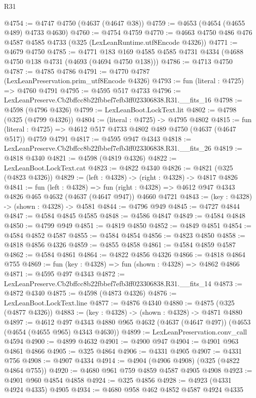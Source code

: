 \begin{lexlean}{R31}
\begin{coremodule}
@4754 := @4747 @4750 (@4637 (@4647 @38))
@4759 := @4653 (@4654 (@4655 @489) @4733 @4630)
@4760 := @4754 @4759
@4770 := @4663 @4750 @486 @476 @4587 @4585 @4733 (@325 (LexLeanRuntime.utf8Encode @4326))
@4771 := @4679 @4750
@4785 := @4771 @183 @169 @4585 @4585 @4731 @4334 (@4688 @4750 @138 @4731 (@4693 (@4694 @4750 @138)))
@4786 := @4713 @4750
@4787 := @4785 @4786
@4791 := @4770 @4787 (LexLeanPreservation.prim_utf8Encode @4326)
@4793 := fun (literal : @4725) => @4760 @4791
@4795 := @4595 @517 @4733
@4796 := LexLeanPreserve.Cb2bffcc8b22fbbef7efb3ff023306838.R31.__fits_16
@4798 := @4598 (@4796 @4326)
@4799 := LexLeanBoot.LockText.lit
@4802 := @4798 (@325 (@4799 @4326))
@4804 := (literal : @4725) -> @4795 @4802
@4815 := fun (literal : @4725) => @4612 @517 @4733 @4802 @489 @4750 (@4637 (@4647 @517)) @4759 @4791
@4817 := @4595 @947 @4343
@4818 := LexLeanPreserve.Cb2bffcc8b22fbbef7efb3ff023306838.R31.__fits_26
@4819 := @4818 @4340
@4821 := @4598 (@4819 @4326)
@4822 := LexLeanBoot.LockText.cat
@4823 := @4822 @4340
@4826 := @4821 (@325 (@4823 @4326))
@4829 := (left : @4328) -> (right : @4328) -> @4817 @4826
@4841 := fun (left : @4328) =>
  fun (right : @4328) => @4612 @947 @4343 @4826 @465 @4632 (@4637 (@4647 @947)) @4660 @4721
@4843 := (key : @4328) -> (shown : @4328) -> @4581
@4844 := @4796 @949
@4845 := @4727 @4844
@4847 := @4584 @4845 @4585
@4848 := @4586 @4847
@4849 := @4584 @4848
@4850 := @4799 @949
@4851 := @4819 @4850
@4852 := @4849 @4851
@4854 := @4584 @4852 @4587
@4855 := @4584 @4854
@4856 := @4823 @4850
@4858 := @4818 @4856 @4326
@4859 := @4855 @4858
@4861 := @4584 @4859 @4587
@4862 := @4584 @4861
@4864 := @4822 @4856 @4326
@4866 := @4818 @4864 @755
@4869 := fun (key : @4328) => fun (shown : @4328) => @4862 @4866
@4871 := @4595 @497 @4343
@4872 := LexLeanPreserve.Cb2bffcc8b22fbbef7efb3ff023306838.R31.__fits_14
@4873 := @4872 @4340
@4875 := @4598 (@4873 @4326)
@4876 := LexLeanBoot.LockText.line
@4877 := @4876 @4340
@4880 := @4875 (@325 (@4877 @4326))
@4883 := (key : @4328) -> (shown : @4328) -> @4871 @4880
@4897 := @4612
    @497
    @4343
    @4880
    @965
    @4632
    (@4637 (@4647 @497))
    (@4653 (@4654 (@4655 @965) @4343 @4630))
@4899 := LexLeanPreservation.conv_call @4594
@4900 := @4899 @4632
@4901 := @4900 @947
@4904 := @4901 @963 @4861 @4866
@4905 := @325 @4864
@4906 := @4331 @4905
@4907 := @4331 @756
@4908 := @4907 @4334
@4914 := @4904 (@4906 @4908) (@325 (@4822 @4864 @755))
@4920 := @4680 @961 @759 @4859 @4587 @4905 @4908
@4923 := @4901 @960 @4854 @4858
@4924 := @325 @4856
@4928 := @4923 (@4331 @4924 @4335) @4905
@4934 := @4680 @958 @462 @4852 @4587 @4924 @4335

\end{coremodule}
\end{lexlean}
